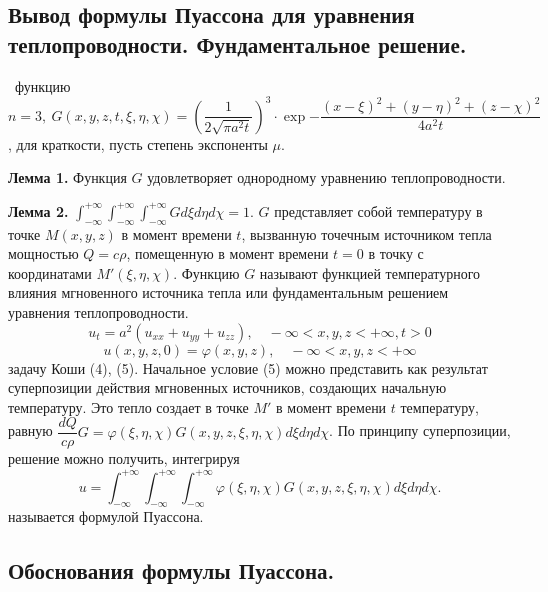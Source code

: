 \documentclass[9pt]{article}
\begin{document}
\subsection{Вывод формулы Пуассона для уравнения теплопроводности. Фундаментальное решение.}

\ 
 функцию \(n=3,\ G(x,y,z,t,\xi,\eta,\chi)=\left(\dfrac{1}{2\sqrt{\pi a^2t}}\right)^3\cdot \exp{-\dfrac{(x-\xi)^2+(y-\eta)^2+(z-\chi)^2}{4a^2t}}\), для краткости, пусть степень экспоненты \(\mu\).
\par\textbf{Лемма 1.} Функция \(G\) удовлетворяет однородному уравнению теплопроводности.
\par\textbf{Лемма 2.} \(\int_{-\infty}^{+\infty}\int_{-\infty}^{+\infty}\int_{-\infty}^{+\infty}Gd\xi d\eta d\chi=1\).
\parФункция \(G\) представляет собой температуру в точке \(M(x,y,z)\) в момент времени \(t\), вызванную точечным источником тепла мощностью \(Q=c\rho\), помещенную в момент времени \(t=0\) в точку с координатами \(M'(\xi,\eta,\chi)\). Функцию \(G\) называют функцией температурного влияния мгновенного источника тепла или фундаментальным решением уравнения теплопроводности.
\begin{equation}
    u_t=a^2(u_{xx}+u_{yy}+u_{zz}),\quad -\infty<x,y,z<+\infty,t>0
\end{equation}
\begin{equation}
    u(x,y,z,0)=\varphi(x,y,z),\quad -\infty<x,y,z<+\infty
\end{equation}
 задачу Коши (4), (5). Начальное условие (5) можно представить как результат суперпозиции действия мгновенных источников, создающих начальную температуру. Это тепло создает в точке \(M'\) в момент времени \(t\) температуру, равную \(\dfrac{dQ}{c\rho}G=\varphi(\xi,\eta,\chi)G(x,y,z,\xi,\eta,\chi)d\xi d\eta d\chi\). По принципу суперпозиции, решение можно получить, интегрируя
\[u=\int_{-\infty}^{+\infty}\int_{-\infty}^{+\infty}\int_{-\infty}^{+\infty}\varphi(\xi,\eta,\chi)G(x,y,z,\xi,\eta,\chi)d\xi d\eta d\chi.\]
\parРешение называется формулой Пуассона.

\subsection{Обоснования формулы Пуассона.}
\end{document}
